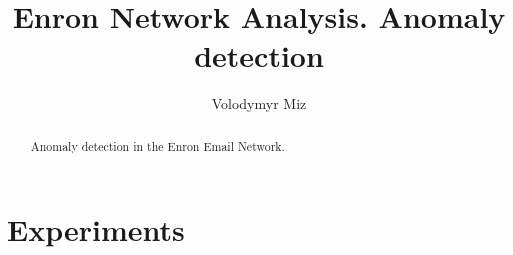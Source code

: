 \documentclass[]{article}
\title{Enron Network Analysis. Anomaly detection}
\author{Volodymyr Miz}
\begin{document}
\maketitle

\begin{abstract}
Anomaly detection in the Enron Email Network.
\end{abstract}

\section{Experiments}
\end{document}

